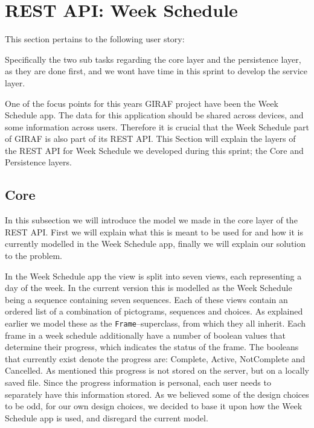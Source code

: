 \section{REST API: Week Schedule}\label{sec:restws}
This section pertains to the following user story:
\begin{center}
\end{center}
Specifically the two sub tasks regarding the core layer and the persistence layer, as they are done first, and we wont have time in this sprint to develop the service layer.

\noindent
One of the focus points for this years GIRAF project have been the Week Schedule app.
The data for this application should be shared across devices, and some information across users.
Therefore it is crucial that the Week Schedule part of GIRAF is also part of its REST API.
This Section will explain the layers of the REST API for Week Schedule we developed during this sprint; the Core and Persistence layers.

\subsection{Core}
In this subsection we will introduce the model we made in the core layer of the REST API.
First we will explain what this is meant to be used for and how it is currently modelled in the Week Schedule app, finally we will explain our solution to the problem.

In the Week Schedule app the view is split into seven views, each representing a day of the week.
In the current version this is modelled as the Week Schedule being a sequence containing seven sequences.
Each of these views contain an ordered list of a combination of pictograms, sequences and choices.
As explained earlier we model these as the \texttt{Frame}--superclass, from which they all inherit. %
Each frame in a week schedule additionally have a number of boolean values that determine their progress, which indicates the status of the frame.
The booleans that currently exist denote the progress are: Complete, Active, NotComplete and Cancelled.
As mentioned this progress is not stored on the server, but on a locally saved file.
Since the progress information is personal, each user needs to separately have this information stored.
As we believed some of the design choices to be odd, for our own design choices, we decided to base it upon how the Week Schedule app is used, and disregard the current model. 


